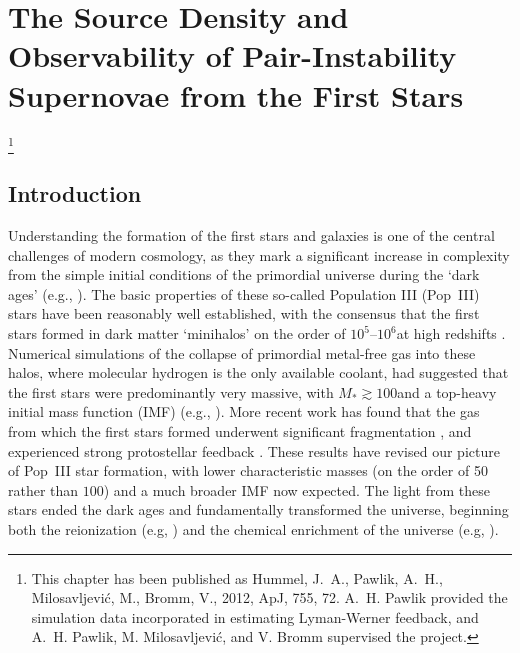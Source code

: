 \documentclass[../thesis.tex]{subfiles}
\begin{document}
\chapter{The Source Density and Observability of Pair-Instability Supernovae from the First Stars}\footnote{This chapter has been published as Hummel, J.~A., Pawlik, A.~H., Milosavljevi\'c, M., Bromm, V., 2012, ApJ, 755, 72. A.~H. Pawlik provided the simulation data incorporated in estimating Lyman-Werner feedback, and A.~H. Pawlik, M. Milosavljevi\'c, and V. Bromm supervised the project.}

\section{Introduction}
Understanding the formation of the first stars and galaxies is one of
the central challenges of modern cosmology, as they mark a significant
increase in complexity from the simple initial conditions of the
primordial universe during the `dark ages' (e.g.,
\citealt{BarkanaLoeb2001, Miralda-Escude2003, Brommetal2009,
  Loeb2010}). The basic properties of these so-called Population III
(Pop~III) stars have been reasonably well established, with the
consensus that the first stars formed in dark matter `minihalos' on
the order of $10^5$--$10^6$\msun at high redshifts
\citep{CouchmanRees1986,HaimanThoulLoeb1996,Tegmarketal1997}.
Numerical simulations of the collapse of primordial metal-free gas
into these halos, where molecular hydrogen is the only available
coolant, had suggested that the first stars were predominantly very
massive, with $M_* \gtrsim100$\msun and a top-heavy initial mass
function (IMF) (e.g., \citealt{BrommCoppiLarson1999,
  BrommCoppiLarson2002, AbelBryanNorman2002, BrommLarson2004,
  Yoshidaetal2006, OSheaNorman2007}).  More recent work has found
that the gas from which the first stars formed underwent significant
fragmentation \citep{StacyGreifBromm2010, Clarketal2011b,
  Greifetal2011, Greifetal2012}, and experienced strong protostellar
feedback \citep{Hosokawaetal2011, StacyGreifBromm2012}.  These results
have revised our picture of Pop~III star formation, with lower
characteristic masses (on the order of 50 rather than $100$\msun) and
a much broader IMF now expected.  The light from these stars ended the
dark ages and fundamentally transformed the universe, beginning both
the reionization (e.g, \citealt{Meiksin2009}) and the chemical
enrichment of the universe (e.g, \citealt{KarlssonBrommHawthorn2013}).
\end{document}
